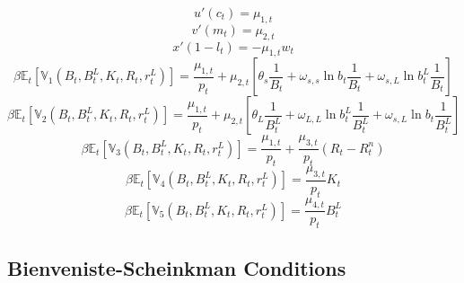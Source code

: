 \documentclass[11pt,a4paper,margin=1.5in]{article}
\begin{document}
\begin{equation}
	u'(c_t) = \mu_{1,t}
	\label{eq:HH_FOC_c}
\end{equation}
%
\begin{equation}
	v'\left(m_t\right) = \mu_{2,t}
	\label{eq:HH_FOC_M}
\end{equation}
%
\begin{equation}
	x'(1-l_t) = -\mu_{1,t}w_t
	\label{eq:HH_FOC_l}
\end{equation}
%
\begin{equation}
	\beta\mathbb{E}_t\!\left[\mathbb{V}\!_1\left(B_{t}, B^L_{t}, K_{t}, R_{t}, r^L_{t}\right)\right] = \frac{\mu_{1,t}}{p_t} + \mu_{2,t}\left[\theta_s\frac{1}{B_t} + \omega_{s,s}\ln b_t \frac{1}{B_t} + \omega_{s,L}\ln b^L_t \frac{1}{B_t}\right]
	\label{eq:HH_FOC_B}
\end{equation}
%
\begin{equation}
	\beta\mathbb{E}_t\!\left[\mathbb{V}\!_2\left(B_{t}, B^L_{t}, K_{t}, R_{t}, r^L_{t}\right)\right] = \frac{\mu_{1,t}}{p_t} + \mu_{2,t}\left[\theta_L\frac{1}{B^L_t} + \omega_{L,L}\ln b^L_t \frac{1}{B^L_t} + \omega_{s,L}\ln b_t \frac{1}{B^L_t}\right]
	\label{eq:HH_FOC_BL}
\end{equation}
%
\begin{equation}
	\beta\mathbb{E}_t\!\left[\mathbb{V}\!_3\left(B_{t}, B^L_{t}, K_{t}, R_{t}, r^L_{t}\right)\right] = \frac{\mu_{1,t}}{p_t} + \frac{\mu_{3,t}}{p_t}\left(R_t - R^{n}_t\right)
	\label{eq:HH_FOC_K}
\end{equation}
%
\begin{equation}
	\beta\mathbb{E}_t\!\left[\mathbb{V}\!_4\left(B_{t}, B^L_{t}, K_{t}, R_{t}, r^L_{t}\right)\right] = \frac{\mu_{3,t}}{p_t}K_t
	\label{eq:HH_FOC_R}
\end{equation}
%
\begin{equation}
	\beta\mathbb{E}_t\!\left[\mathbb{V}\!_5\left(B_{t}, B^L_{t}, K_{t}, R_{t}, r^L_{t}\right)\right] = \frac{\mu_{4,t}}{p_t}B^L_t
	\label{eq:HH_FOC_rL}
\end{equation}

\subsection{Bienveniste-Scheinkman Conditions}
\end{document}
